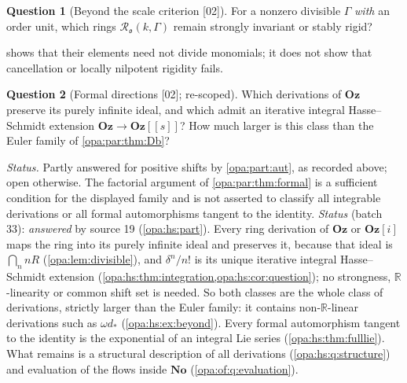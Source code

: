 \documentclass[11pt,oneside]{article}
\numberwithin{equation}{section}
\theoremstyle{definition}
\newtheorem{question}[question]{Question}
\theoremstyle{remark}
\newcommand{\No}{\mathbf{No}}
\newcommand{\Oz}{\mathbf{Oz}}
\newcommand{\Og}{\mathbf{Oz}[i]}
\newcommand{\R}{\mathbb R}
\newcommand{\oo}{\mathfrak o}
\newcommand{\src}[1]{\textup{\textsf{\small[#1]}}}
\begin{document}
\begin{question}[Beyond the scale criterion \src{02}]\label{opa:par:q:orderunit}
For a nonzero divisible $\Gamma$ \emph{with} an order unit, which rings
$\mathcal R_\oo(k,\Gamma)$ remain strongly invariant or stably rigid?
\end{question}
 shows that their elements need not divide monomials; it does not
show that cancellation or locally nilpotent rigidity fails.

\begin{question}[Formal directions \src{02}; re-scoped]\label{opa:par:q:directions}
Which derivations of $\Oz$ preserve its purely infinite ideal, and which admit an
iterative integral Hasse--Schmidt extension $\Oz\to\Oz[[s]]$? How much larger is this
class than the Euler family of \cref{opa:par:thm:Db}?
\end{question}
\emph{Status.} Partly answered for positive shifts by \cref{opa:part:aut}, as recorded
above; open otherwise. The factorial argument of \cref{opa:par:thm:formal} is a
sufficient condition for the displayed family and is not asserted to classify all
integrable derivations or all formal automorphisms tangent to the identity.
\emph{Status} (batch 33): \emph{answered} by source 19 (\cref{opa:hs:part}). Every ring
derivation of $\Oz$ or $\Og$ maps the ring into its purely infinite ideal and preserves it,
because that ideal is $\bigcap_nnR$ (\cref{opa:lem:divisible}), and $\delta^n/n!$ is its unique
iterative integral Hasse--Schmidt extension (\cref{opa:hs:thm:integration,opa:hs:cor:question});
no strongness, $\R$-linearity or common shift set is needed. So both classes are the whole
class of derivations, strictly larger than the Euler family: it contains non-$\R$-linear
derivations such as $\omega d_*$ (\cref{opa:hs:ex:beyond}). Every formal automorphism tangent
to the identity is the exponential of an integral Lie series (\cref{opa:hs:thm:fulllie}).
What remains is a structural description of all derivations (\cref{opa:hs:q:structure}) and
evaluation of the flows inside $\No$ (\cref{opa:of:q:evaluation}).
\end{document}
